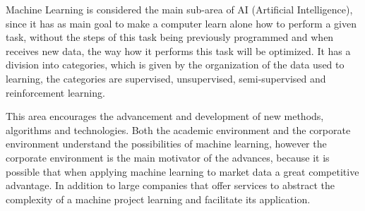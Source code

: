Machine Learning is considered the main sub-area of ​​AI (Artificial Intelligence), since it has as main goal to make a 
computer learn alone how to perform a given task, without the steps of this task being previously programmed
and when receives new data, the way how it performs this task will be optimized. 
It has a division into categories, which is given by the organization of the data used to learning, the categories are
supervised, unsupervised, semi-supervised and reinforcement learning. 


This area encourages the advancement and development of new methods, algorithms and technologies. Both the academic environment 
and the corporate environment understand the possibilities of machine learning, however the corporate environment is 
the main motivator of the advances, because it is possible that when applying machine learning to market data a 
great competitive advantage. In addition to large companies that offer services to abstract the complexity of a 
machine project learning and facilitate its application.
